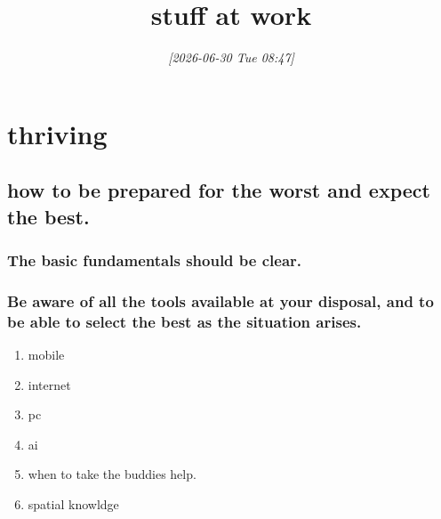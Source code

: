 \documentclass[11pt]{article}
\date{\textit{{[}2026-06-30 Tue 08:47]}}
\title{stuff at work}
\begin{document}
\maketitle
\tableofcontents

\section{thriving}
\label{sec:org7b95870}
\subsection{how to be prepared for the worst and expect the best.}
\label{sec:orgf6b5394}
\subsubsection{The basic fundamentals should be clear.}
\label{sec:org74c8b2d}
\subsubsection{Be aware of all the tools available at your disposal, and to be able to select the best as the situation arises.}
\label{sec:orga3eddee}
\begin{enumerate}
\item mobile
\label{sec:org9e08474}
\item internet
\label{sec:orgdd6d59d}
\item pc
\label{sec:org86082bd}
\item ai
\label{sec:org9aefe17}
\item when to take the buddies help.
\label{sec:orgb4f62de}
\item spatial knowldge
\label{sec:orgcf117a5}
\end{enumerate}
\end{document}
